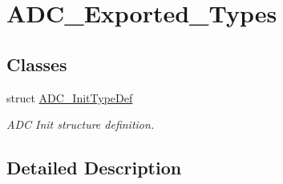 \hypertarget{group___a_d_c___exported___types}{}\section{A\+D\+C\+\_\+\+Exported\+\_\+\+Types}
\label{group___a_d_c___exported___types}
\subsection*{Classes}
\begin{DoxyCompactItemize}
\item 
struct \hyperlink{struct_a_d_c___init_type_def}{A\+D\+C\+\_\+\+Init\+Type\+Def}
\begin{DoxyCompactList}\small\item\em A\+DC Init structure definition. \end{DoxyCompactList}\end{DoxyCompactItemize}


\subsection{Detailed Description}

